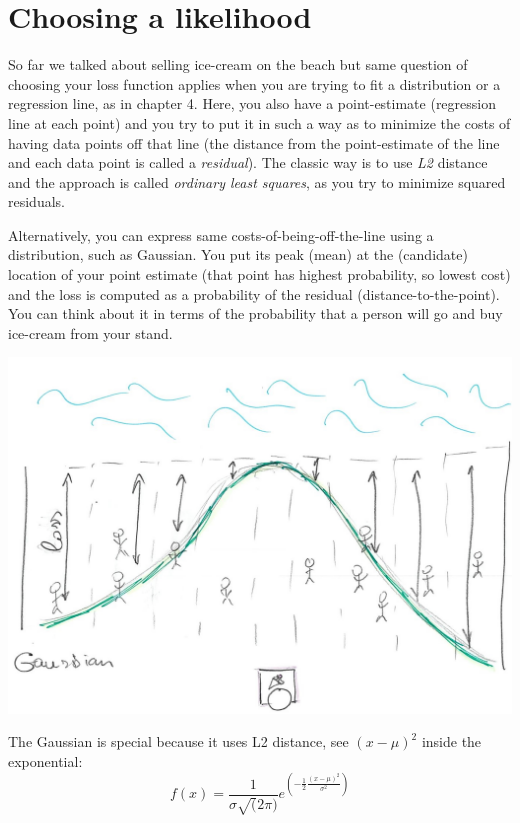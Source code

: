 \documentclass[
]{book}
\begin{document}
\hypertarget{choosing-a-likelihood}{%
\section{Choosing a likelihood}\label{choosing-a-likelihood}}

So far we talked about selling ice-cream on the beach but same question of choosing your loss function applies when you are trying to fit a distribution or a regression line, as in chapter 4. Here, you also have a point-estimate (regression line at each point) and you try to put it in such a way as to minimize the costs of having data points off that line (the distance from the point-estimate of the line and each data point is called a \emph{residual}). The classic way is to use \emph{L2} distance and the approach is called \emph{ordinary least squares}, as you try to minimize squared residuals.

Alternatively, you can express same costs-of-being-off-the-line using a distribution, such as Gaussian. You put its peak (mean) at the (candidate) location of your point estimate (that point has highest probability, so lowest cost) and the loss is computed as a probability of the residual (distance-to-the-point). You can think about it in terms of the probability that a person will go and buy ice-cream from your stand.

\begin{center}\includegraphics[width=1\linewidth]{images/loss-functions-Gaussian} \end{center}

The Gaussian is special because it uses L2 distance, see \((x - \mu)^2\) inside the exponential:
\[f(x) = \frac{1}{\sigma \sqrt(2 \pi)}e^{\left(-\frac{1}{2}\frac{(x - \mu)^2}{\sigma^2}\right)}\]
\end{document}
